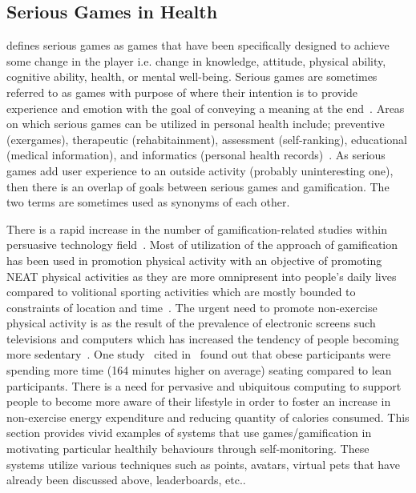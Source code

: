 \subsection{Serious Games in Health}
\cite{mccallum2012gamification} defines serious games as games that have been specifically designed to achieve some change in the player i.e. change in knowledge, attitude, physical ability, cognitive ability, health, or mental well-being. Serious games are sometimes referred to as games with purpose of  where their intention is to provide experience and emotion with the goal of conveying a meaning at the end~\citep{marsh2011serious}. Areas on which serious games can be utilized in personal health include; preventive (exergames), therapeutic (rehabitainment), assessment (self-ranking), educational (medical information), and informatics (personal health records)~\citep{mccallum2012gamification}. As serious games add user experience to an outside activity (probably uninteresting one), then there is an overlap of goals between serious games and gamification. The two terms are sometimes used as synonyms of each other.

There is a rapid increase in the number of gamification-related studies within persuasive technology field~\citep{hamari2014persuasive}. Most of utilization of the approach of gamification has been used in promotion physical activity with an objective of promoting NEAT physical activities as they are more omnipresent into people's daily lives compared to volitional sporting activities which are mostly bounded to constraints of location and time~\citep{fujiki2008neat}. The urgent need to promote non-exercise physical activity is as the result of the prevalence of electronic screens such televisions and computers which has increased the tendency of people becoming more sedentary~\citep{berkovsky2010physical}. One study~\citep{levine2006non} cited in~\cite{fujiki2008neat} found out that obese participants were spending more time (164 minutes higher on average) seating  compared to lean participants. There is a need for pervasive and ubiquitous computing to support people to become more aware of their lifestyle in order to foster an increase in non-exercise energy expenditure and reducing quantity of calories consumed. This section provides vivid examples of systems that use games/gamification in motivating particular healthily  behaviours through self-monitoring. These systems utilize various techniques such as points, avatars, virtual pets that have already been discussed above, leaderboards, etc.. 

